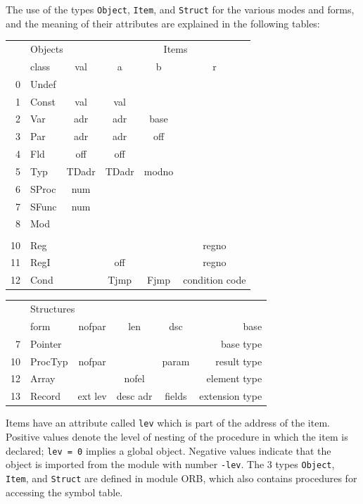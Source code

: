 The use of the types \verb|Object|, \verb|Item|, and \verb|Struct| for the various modes and forms,
and the meaning of their attributes are explained in the following tables:
\begin{table}[h!]
  \centering
  \begin{tabular}{r l c|c c c}
       & \multicolumn{2}{l}{Objects} & \multicolumn{3}{c}{Items} \\
       & class & val   & a     & b    & r \\\hline
     0 & Undef &      \\
     1 & Const & val   & val  \\
     2 & Var   & adr   & adr   & base \\
     3 & Par   & adr   & adr   & off  \\
     4 & Fld   & off   & off  \\
     5 & Typ   & TDadr & TDadr & modno\\
     6 & SProc & num  \\
     7 & SFunc & num  \\
     8 & Mod  \\      \\
    10 & Reg   &       &       &      & regno \\
    11 & RegI  &       & off   &      & regno \\
    12 & Cond  &       & Tjmp  & Fjmp & condition code
  \end{tabular}
\end{table}
\begin{table}[h!]
  \centering
  \begin{tabular}{r l c c c r}
       & \multicolumn{5}{l}{Structures} \\
       & form    & nofpar  & len      & dsc    & base \\\hline
     7 & Pointer &         &          &        &      base type \\
    10 & ProcTyp & nofpar  &          & param  &    result type \\
    12 & Array   &         & nofel    &        &   element type \\
    13 & Record  & ext lev & desc adr & fields & extension type
  \end{tabular}
\end{table}
Items have an attribute called \verb|lev| which is part of the address of the item. Positive values
denote the level of nesting of the procedure in which the item is declared; \verb|lev = 0| implies a
global object.  Negative values indicate that the object is imported from the module with number
\verb|-lev|.  The 3 types \verb|Object|, \verb|Item|, and \verb|Struct| are defined in module ORB,
which also contains procedures for accessing the symbol table.

